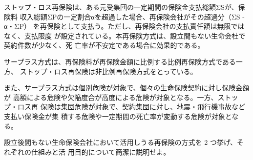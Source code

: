 \documentclass[report,gutter=10mm,fore-edge=10mm,uplatex,dvipdfmx]{jlreq}
\begin{document}
ストップ・ロス再保険は、ある元受集団の一定期間の保険金支払総額ΣSが、保険料
収入総額ΣPの一定割合αを超過した場合、再保険会社がその超過分（ΣS - α・ΣP）
を再保険として支払う。ただし、再保険会社の支払責任額は無限ではなく、支払限度
が設定されている。本再保険方式は、設立間もない生命会杜で契約件数が少なく、死
亡率が不安定である場合に効果的である。

サープラス方式は、再保険料が再保険金額に比例する比例再保険方式である一方、
ストップ・ロス再保険は非比例再保険方式をとっている。

また、サープラス方式は個別危険が対象で、個々の生命保険契約に対し保険金額が
高額による危険や欠陥度合が高度による危険が対象となる。一方、ストップ・ロス再
保険は集団危険が対象で、契約集団に対し、地震・飛行機事故など支払い保険金が集
積する危険や一定期間の死亡率が変動する危険が対象となる。

設立後間もない生命保険会社において活用しうる再保険の方式を 2 つ挙げ、それぞれの仕組みと活
用目的について簡潔に説明せよ。
\end{document}
